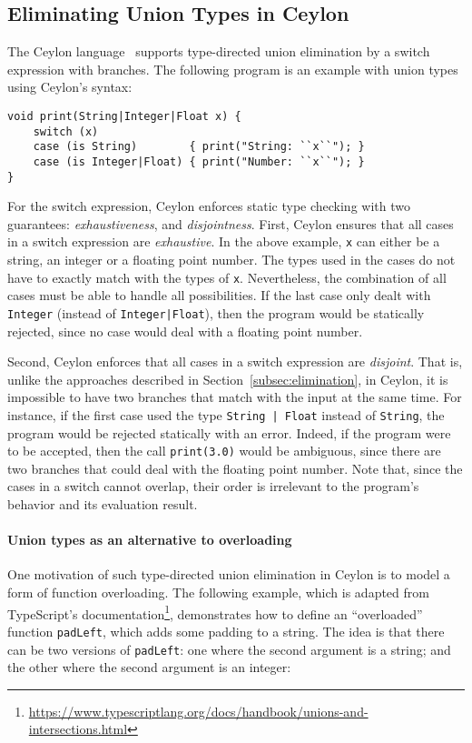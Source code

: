 \subsection{Eliminating Union Types in Ceylon}

The Ceylon language~\cite{king2013ceylon} supports type-directed union elimination by a
switch expression with branches. The following program is an example
with union types using Ceylon's syntax:

\begin{lstlisting}
void print(String|Integer|Float x) {
	switch (x)
	case (is String)        { print("String: ``x``"); }
	case (is Integer|Float) { print("Number: ``x``"); }
}
\end{lstlisting}
%

For the switch expression, Ceylon enforces static type checking with two
guarantees: \textit{exhaustiveness}, and \textit{disjointness}. First, Ceylon
ensures that all cases in a switch expression are \textit{exhaustive}. In the above
example, \lstinline{x} can either be a string, an integer or a floating point
number. The types used in the cases do not have to exactly match with the types
of \lstinline{x}. Nevertheless, the combination of all cases must be able to
handle all possibilities. If the last case only dealt with
\lstinline{Integer} (instead of \lstinline{Integer|Float}), then the program
would be statically rejected, since no case would deal with a floating point
number.

Second, Ceylon enforces that all cases in a switch expression are
\textit{disjoint}. That is, unlike the approaches described in
Section~\ref{subsec:elimination}, in Ceylon, it is impossible to have two
branches that match with the input at the same time. For instance, if the first
case used the type \lstinline{String | Float} instead of \lstinline{String}, the
program would be rejected statically with an error. Indeed, if the program
were to be accepted, then the call \lstinline{print(3.0)} would be ambiguous,
since there are two branches that could deal with the floating point number. Note that, since
the cases in a switch cannot overlap, their order is irrelevant to the program's
behavior and its evaluation result.

\paragraph{Union types as an alternative to overloading}
One motivation of such type-directed union elimination in Ceylon is to
model a form of function overloading.
The following example, which is adapted from TypeScript's documentation\footnote{\url{https://www.typescriptlang.org/docs/handbook/unions-and-intersections.html}},
demonstrates how to define an ``overloaded'' function \lstinline{padLeft},
which adds some padding to a string. The idea is that there can be two versions
of \lstinline{padLeft}: one where the second argument is a string; and
the other where the second argument is an integer:

